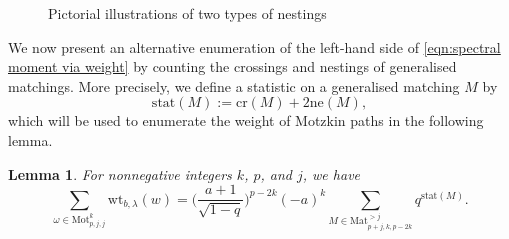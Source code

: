 \documentclass{amsart}
\theoremstyle{plain}
\newtheorem{lem}[thm]{Lemma}
\theoremstyle{remark}
\numberwithin{equation}{section}
\begin{document}
\begin{figure}[H]
\centering
{}
\caption{Pictorial illustrations of two types of nestings}
\end{figure}

We now present an alternative enumeration of the left-hand side of \eqref{eqn:spectral moment via weight} by counting the crossings and nestings of generalised matchings. More precisely, we define a statistic on a generalised matching \( M \) by  
\begin{equation}\label{def of stat(M)}
    \mathrm{stat}(M):=\mathrm{cr}(M)+2\mathrm{ne}(M), 
\end{equation}
which will be used to enumerate the weight of Motzkin paths in the following lemma.

\begin{lem}
    For nonnegative integers $k$, $p$, and $j$, we have 
    \begin{equation}
    \sum_{\omega\in\mathrm{Mot}^{k}_{p,j,j}}\mathrm{wt}_{b,\lambda}(w)
    =
    \Big(\frac{a+1}{\sqrt{1-q}}\Big)^{p-2k}
    (-a)^{k}
    \sum_{M{\in}{\mathrm{Mat}}^{>j}_{p+j,k,p-2k}}q^{\mathrm{stat}(M)}.
    \end{equation}
\end{lem}
\end{document}
